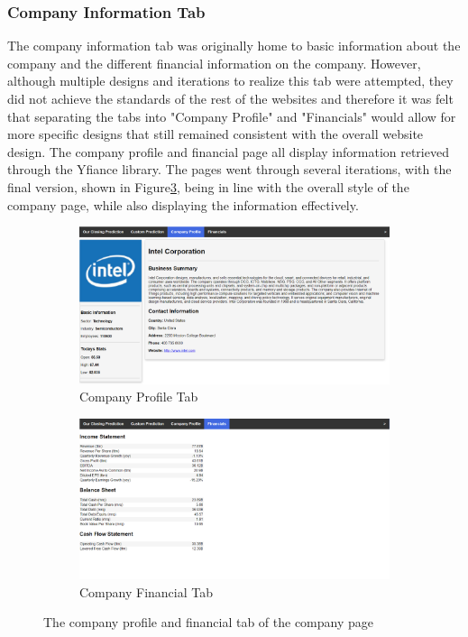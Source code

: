             \subsubsection{Company Information Tab}
            The company information tab was originally home to basic information about the company and the different financial information on the company. However, although multiple designs and iterations to realize this tab were attempted, they did not achieve the standards of the rest of the websites and therefore it was felt that separating the tabs into "Company Profile" and "Financials" would allow for more specific designs that still remained consistent with the overall website design. The company profile and financial page all display information retrieved through the Yfiance \cite{technology:yfinance} library. The pages went through several iterations, with the final version, shown in Figure\ref{fig:info_page}, being in line with the overall style of the company page, while also displaying the information effectively. 
            
            \begin{figure}[!h]
            \begin{subfigure}[b]{0.5\textwidth}
                \includegraphics[width=\textwidth]{images/upload/CompanyInfo.PNG}
                \caption{Company Profile Tab}
                \label{fig:profile_tab}
            \end{subfigure}
            \hfill
            \begin{subfigure}[b]{0.5\textwidth}
                \includegraphics[width=\textwidth]{images/upload/Financial.PNG}
                \caption{Company Financial Tab}
                \label{fig:fin_tab}
            \end{subfigure}
            \caption{The company profile and financial tab of the company page}
            \label{fig:info_page}
            \end{figure}
            
